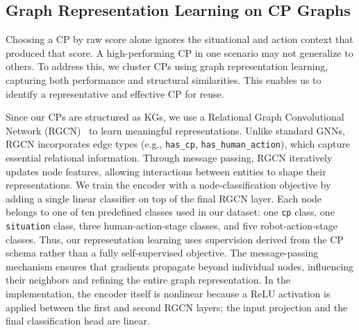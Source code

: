 \documentclass[letterpaper, 10 pt, conference]{ieeeconf}  %
\begin{document}
\subsection{Graph Representation Learning on CP Graphs}
\label{sec:graph_learning}

Choosing a CP by raw score alone ignores the situational and action context that
produced that score. A high-performing CP in one scenario may not generalize to others.
To address this, we cluster CPs using graph representation learning, capturing both
performance and structural similarities. This enables us to identify a representative
and effective CP for reuse. 

Since our CPs are structured as KGs, we use a Relational Graph Convolutional Network
(RGCN)~\cite{schlichtkrull2017modelingrelationaldatagraph} to learn meaningful
representations. Unlike standard GNNs, RGCN incorporates edge types (e.g.,
\texttt{has\_cp}, \texttt{has\_human\_action}), which capture essential relational
information. Through message passing, RGCN iteratively updates node features, allowing
interactions between entities to shape their representations. We train the encoder with
a node-classification objective by adding a single linear classifier on top of the
final RGCN layer. Each node belongs to one of ten predefined classes used in our
dataset: one \texttt{cp} class, one \texttt{situation} class, three human-action-stage
classes, and five robot-action-stage classes. Thus, our
representation learning uses supervision derived from the CP schema rather than a fully
self-supervised objective. The message-passing mechanism ensures that gradients
propagate beyond individual nodes, influencing their neighbors and refining the entire
graph representation. In the implementation, the encoder itself is nonlinear because a
ReLU activation is applied between the first and second RGCN layers; the input
projection and the final classification head are linear.
\end{document}
